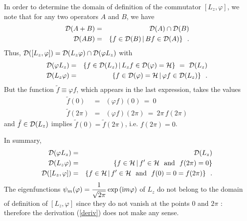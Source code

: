 \documentclass[12pt]{report}
\begin{document}
In order to determine the domain of definition of the commutator 
$[L_z, \varphi ]$, we note that for any two operators $A$ and $B$,
we have 
\begin{eqnarray}
{\cal D} (A+B) & = & {\cal D}(A) \cap {\cal D}(B)
\\
{\cal D} (AB) & = & \{ f \in {\cal D}(B)\, | \, Bf \in {\cal D}(A) \}
\nonumber
\ \ .
\end{eqnarray}
 Thus, 
${\cal D} ([L_z, \varphi]) = {\cal D}(L_z \varphi ) \cap
{\cal D} (\varphi L_z )$ with 
\begin{eqnarray*}
{\cal D} (\varphi L_z )
& = & \{ f \in {\cal D}(L_z) \, | \, L_z f \in {\cal D}(\varphi )= {\cal H} \}
\ = \ {\cal D} (L_z )
\\
{\cal D} (L_z  \varphi) & = &
\{ f \in {\cal D}(\varphi) ={\cal H} \, | \, \varphi  f \in {\cal D}(L_z) \}
\ \ .
\end{eqnarray*}
But the function 
$\tilde f \equiv \varphi f$, which appears in the last expression,  
takes the values 
\begin{eqnarray*}
\tilde f (0) & = & (\varphi f)(0) \ = \ 0
\\
\tilde f (2 \pi ) & = & (\varphi f)(2\pi ) \ = \ 2 \pi \, f (2 \pi)
\end{eqnarray*}
 and $\tilde f \in {\cal D}(L_z)$ implies 
$\tilde f (0) =
\tilde f (2 \pi )$, i.e. $f(2\pi ) = 0$.
 
In summary, 
\begin{eqnarray}
{\cal D} (\varphi L_z )
& = & {\cal D} (L_z )
\nonumber
\\
{\cal D} (L_z  \varphi) & = &
\{ f \in {\cal H} \, | \, f^{\prime} \in {\cal H} \ \ {\rm and} \ \
f (2 \pi ) =0 \}
\\
{\cal D} ([ L_z , \varphi ]) & = &
\{ f \in {\cal H} \, | \, f^{\prime} \in {\cal H} \ \ {\rm and} \ \
f (0) =0 =
f (2 \pi ) \}
\ \ .
\nonumber
\end{eqnarray}
The eigenfunctions 
$\psi_m ( \varphi ) = \displaystyle{1 \over \sqrt{2\pi} } \, {\rm exp}\,
( {\rm i}  m \varphi )$ of $L_z$
do not belong to the domain of definition of 
$[ L_z , \varphi ]$ since they do not vanish at the points 
$0$ and 
$2\pi$ : therefore the 
derivation (\ref{deriv}) does not make any sense. 
 
\bigskip
 
\end{document}
